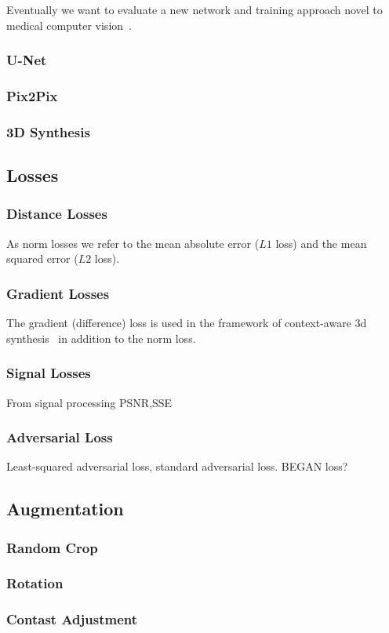 Eventually we want to evaluate a new network and training approach novel to
medical computer vision~\cite{Karras17}.

\subsubsection{U-Net}


\subsubsection{Pix2Pix}

\subsubsection{3D Synthesis}

\subsection{Losses}

\subsubsection{Distance Losses}

As norm losses we refer to the mean absolute error ($L1$ loss) and the
mean squared error ($L2$ loss).

\subsubsection{Gradient Losses}

The gradient (difference) loss is used in the framework of context-aware
3d synthesis~\cite{Nie16} in addition to the norm loss.

\subsubsection{Signal Losses}

From signal processing PSNR,SSE

\subsubsection{Adversarial Loss}

Least-squared adversarial loss, standard adversarial loss. BEGAN loss?


\subsection{Augmentation}

\subsubsection{Random Crop}
\subsubsection{Rotation}
\subsubsection{Contast Adjustment}


